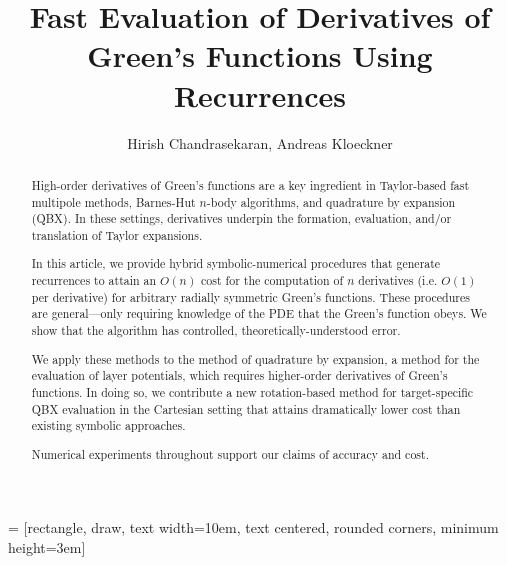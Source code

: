 \documentclass[12pt]{article}
\title{Fast Evaluation of Derivatives of Green's Functions Using Recurrences}
\theoremstyle{definition}
\theoremstyle{plain}
\theoremstyle{definition}
\begin{document}
 = [rectangle, draw, text width=10em, text centered, rounded      corners, minimum height=3em]
\author{Hirish Chandrasekaran, Andreas Kloeckner}
\maketitle 

\begin{abstract}
High-order derivatives of Green's functions are a key ingredient in Taylor-based fast multipole methods, Barnes-Hut $n$-body algorithms, and quadrature by expansion (QBX). In these settings, derivatives underpin the formation, evaluation, and/or translation of Taylor expansions. 

In this article, we provide hybrid symbolic-numerical procedures that generate recurrences to attain an $O(n)$ cost for the computation of $n$ derivatives (i.e. $O(1)$ per derivative) for arbitrary radially symmetric Green's functions. These procedures are general---only requiring knowledge of the PDE that the Green's function obeys. We show that the algorithm has controlled, theoretically-understood error.


We apply these methods to the method of quadrature by expansion, a method for the evaluation of layer potentials, which requires higher-order derivatives of Green's functions. In doing so, we contribute a new rotation-based method for target-specific QBX evaluation in the Cartesian setting that attains dramatically lower cost than existing symbolic approaches. 

Numerical experiments throughout support our claims of accuracy and cost. 


\end{abstract}
\end{document}
